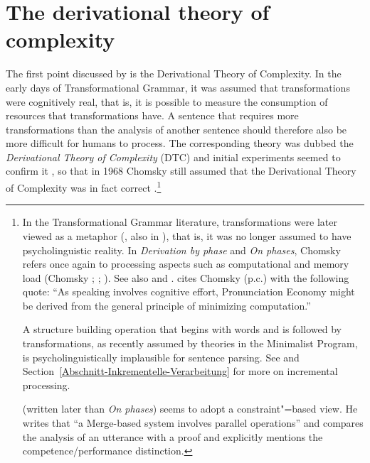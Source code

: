 \section{The derivational theory of complexity}
\label{sec-dtc}

The first point discussed by \citet{SW2011a} is the Derivational Theory of Complexity.
In  the early days of Transformational Grammar,
it was assumed that transformations were cognitively real, that is, it is possible to measure the consumption of resources
that transformations have.
A sentence that requires more transformations than the analysis of another sentence should therefore also be more difficult for humans
to process. The corresponding theory was dubbed the \emph{Derivational Theory of Complexity} (DTC) and initial experiments
seemed to confirm it \citep{MMK64a,SP65a,CO66a}, so that in 1968 Chomsky still assumed that the
\pagebreak
Derivational Theory of Complexity was in fact correct
\citep[--250]{Chomsky76b-u}.\footnote{%
In the Transformational Grammar literature, transformations were later viewed as a metaphor
(\citealp[]{Lohnstein2014a}, also in \citealp[Footnote~4]{Chomsky2001a-u}), that is,
it was no longer assumed to have psycholinguistic reality. In \emph{Derivation by phase} and
\emph{On phases}, Chomsky refers once again to processing aspects such as computational and memory load (Chomsky \citeyear[, 12,
   15]{Chomsky2001a-u}; \citeyear[, 12]{Chomsky2007a}; \citeyear[, 145, 146,
   155]{Chomsky2008a}). See also  and
. \citet[]{Trinh2011a} cites Chomsky (p.c.) with the following quote:
``As speaking involves cognitive effort, Pronunciation Economy might be derived from the general principle of minimizing computation.'' 

  A structure building operation that begins with words and is followed by transformations, as recently assumed by theories in the Minimalist Program,
  is psycholinguistically implausible for sentence parsing. See  and Section~\ref{Abschnitt-Inkrementelle-Verarbeitung} for
  more on incremental processing.

  \citet[]{Chomsky2007a} (written later than \emph{On phases}) seems to adopt a constraint"=based view. He writes that ``a Merge-based system involves parallel operations''
  and compares the analysis of an utterance with a proof and explicitly mentions the competence/performance distinction.
} 

